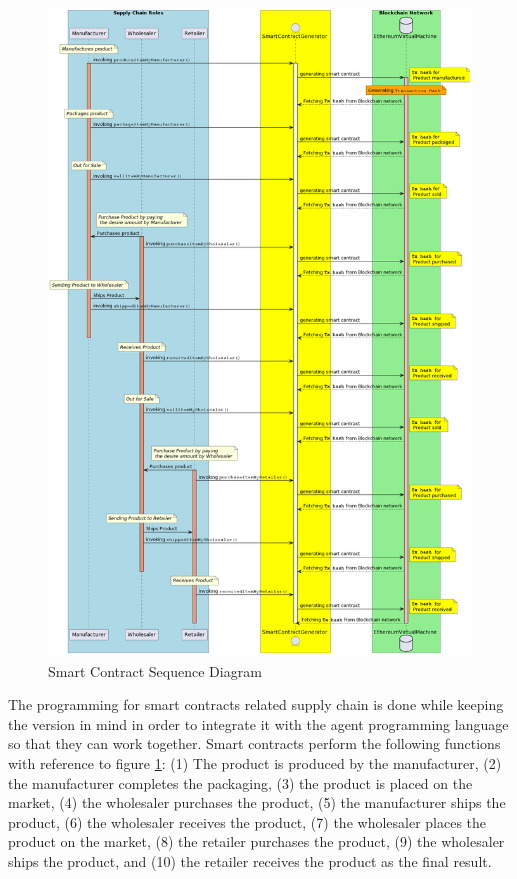     \begin{figure}[h!]
    \centering
      \includegraphics[width=12cm]{includes/figures/Sequence Diagram.png} 
      \caption{Smart Contract Sequence Diagram}
      \label{Smart Contract Sequence Diagram}
    \end{figure}

The programming for smart contracts related supply chain is done while keeping the version in mind in order to integrate it with the agent programming language so that they can work together. Smart contracts perform the following functions with reference to figure \ref{Smart Contract Sequence Diagram}: (1) The product is produced by the manufacturer, (2) the manufacturer completes the packaging, (3) the product is placed on the market, (4) the wholesaler purchases the product, (5) the manufacturer ships the product, (6) the wholesaler receives the product, (7) the wholesaler places the product on the market, (8) the retailer purchases the product, (9) the wholesaler ships the product, and (10) the retailer receives the product as the final result.

